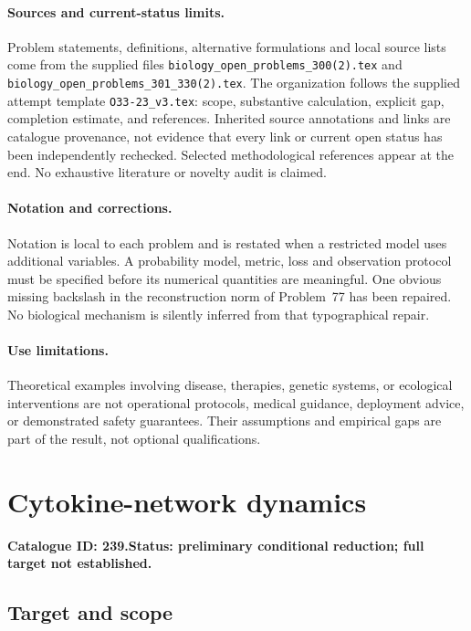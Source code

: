 \documentclass[11pt]{article}
\begin{document}
\paragraph{Sources and current-status limits.}
Problem statements, definitions, alternative formulations and local source lists
come from the supplied files
\texttt{biology\_open\_problems\_300(2).tex} and
\texttt{biology\_open\_problems\_301\_330(2).tex}.
The organization follows the supplied attempt template
\texttt{O33-23\_v3.tex}: scope, substantive calculation, explicit gap,
completion estimate, and references. Inherited source annotations and links are
catalogue provenance, not evidence that every link or current open status has
been independently rechecked. Selected methodological references appear at the
end. No exhaustive literature or novelty audit is claimed.

\paragraph{Notation and corrections.}
Notation is local to each problem and is restated when a restricted model uses
additional variables. A probability model, metric, loss and observation protocol
must be specified before its numerical quantities are meaningful. One obvious
missing backslash in the reconstruction norm of Problem~77 has been repaired.
No biological mechanism is silently inferred from that typographical repair.

\paragraph{Use limitations.}
Theoretical examples involving disease, therapies, genetic systems, or ecological
interventions are not operational protocols, medical guidance, deployment advice,
or demonstrated safety guarantees. Their assumptions and empirical gaps are part
of the result, not optional qualifications.

\setcounter{section}{238}
\section{Cytokine-network dynamics}
\label{prob:239}
\noindent\textbf{Catalogue ID: 239.}\quad \textbf{Status: preliminary conditional reduction; full target not established.}
\subsection{Target and scope}
\end{document}
